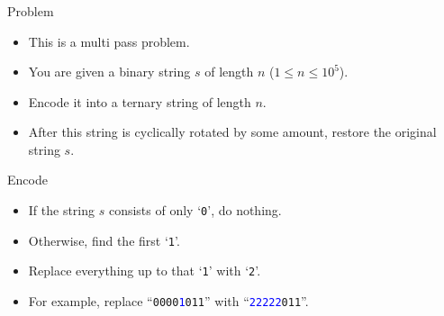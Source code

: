 \begin{frame}
    \frametitle{\problemtitle}
    \begin{block}{Problem}
        \begin{itemize}
            \item This is a multi pass problem.
            \item You are given a binary string $s$ of length $n$ ($1 \leq n \leq 10^5$).
            \item Encode it into a ternary string of length $n$.
            \item After this string is cyclically rotated by some amount, restore the original string $s$.
        \end{itemize}
    \end{block}

    \pause

    \begin{block}{Encode}
        \begin{itemize}
            \item If the string $s$ consists of only `\texttt{0}', do nothing.
            \pause
            \item Otherwise, find the first `\texttt{1}'.
            \item Replace everything up to that `\texttt{1}' with `\texttt{2}'.
            \item For example, replace ``\texttt{0000\textcolor{blue}{1}011}'' with ``\texttt{\textcolor{blue}{22222}011}''.
      \end{itemize}
    \end{block}{}
\end{frame}

